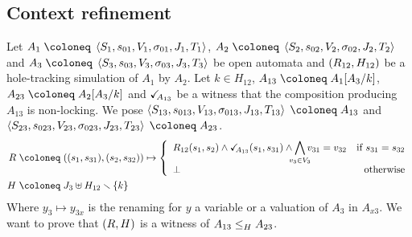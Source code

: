 \documentclass{article}
\begin{document}
\subsection{Context refinement}\label{apx:cr}
Let \(A_1 \defobject \OAg[1]\), \(A_2 \defobject \OAg[2]\) and \(A_3 \defobject \OAg[3]\) be open automata and \(\mpar{R_{12}, H_{12}}\) be a hole-tracking simulation of \(A_1\) by \(A_2\).
Let \(k \in H_{12}\), \(A_{13} \defobject A_1\subst{A_3}{k}\), \(A_{23} \defobject A_2\subst{A_3}{k}\) and \(\reach{A_{13}}\) be a witness that the composition producing \(A_{13}\) is non-locking.
We pose \(\OAg[13] \defobject A_{13}\) and \(\OAg[23] \defobject A_{23}\).
\begin{align*}
	R \defobject & \mpar{\mpar{s_1, s_{31}}, \mpar{s_2, s_{32}}} \mapsto \choice{R_{12}\mpar{s_1, s_2} \wedge \reach{A_{13}}\mpar{s_1, s_{31}} \wedge \bigwedge_\subbox{v_3 \in V_3} v_{31} = v_{32} & \text{if } s_{31} = s_{32} \\ \bot & \text{otherwise}} \\
	H \defobject & J_3 \uplus H_{12} \setminus \mbrc{k}
\end{align*}
Where \(y_3 \mapsto y_{3x}\) is the renaming for \(y\) a variable or a valuation of \(A_3\) in \(A_{x3}\).
We want to prove that \(\mpar{R, H}\) is a witness of \(\wrel{A_{13}}{A_{23}}{H}\).
\end{document}
